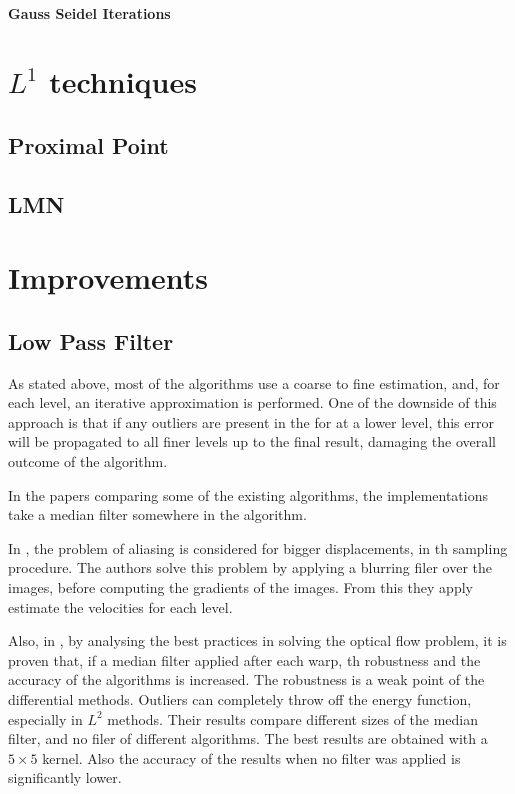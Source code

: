\documentclass[12pt,a4paper,twoside]{report}
\begin{document}
\paragraph{Gauss Seidel Iterations}

\section{$L^1$ techniques}
\subsection{Proximal Point}
\subsection{LMN}

\section{Improvements}
\subsection{Low Pass Filter}

As stated above, most of the algorithms use a coarse to fine estimation, and, for each level, an iterative approximation is performed.
One of the downside of this approach is that if any outliers are present in the for at a lower level, this error will be propagated to all finer levels up to the final result, damaging the overall outcome of the algorithm.

In the papers comparing some of the existing algorithms, the implementations take a median filter somewhere in the algorithm.

In \cite{fleet2006}, the problem of aliasing is considered for bigger displacements, in th sampling procedure. The authors solve this problem by applying a blurring filer over the images, before computing the gradients of the images. From this they apply estimate the velocities for each level.

Also, in \cite{sun2010}, by analysing the best practices in solving the optical flow problem, it is proven that, if a median filter applied after each warp, th robustness and the accuracy of the algorithms is increased.
The robustness is a weak point of the differential methods. Outliers can completely throw off the energy function, especially in $L^2$ methods.
Their results compare different sizes of the median filter, and no filer of different algorithms. The best results are obtained with a $5 \times 5$ kernel. Also the accuracy of the results when no filter was applied is significantly lower.  
\end{document}
